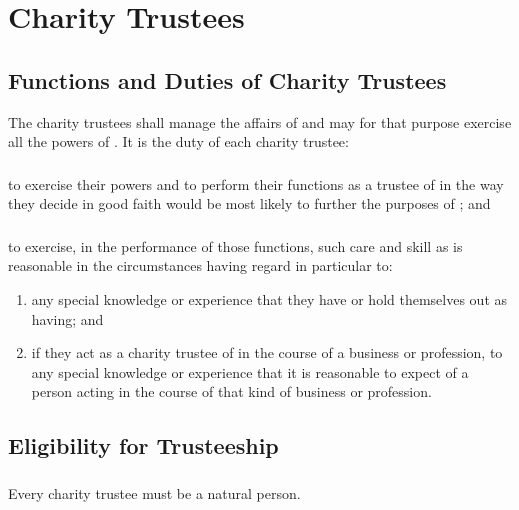 \section{Charity Trustees}
\label{sec:trustees}

    \subsection{Functions and Duties of Charity Trustees}\label{sec:trustee_duties}
    The charity trustees shall manage the affairs of \shortname{} and may for that purpose exercise all the powers of \shortname{}. It is the duty of each charity trustee:

        \subsubsection{}
        to exercise their powers and to perform their functions as a trustee of \shortname{} in the way they decide in good faith would be most likely to further the purposes of \shortname{}; and

        \subsubsection{}
        to exercise, in the performance of those functions, such care and skill as is reasonable in the circumstances having regard in particular to:
        \begin{enumerate}
            \item any special knowledge or experience that they have or hold themselves out as having; and
            \item if they act as a charity trustee of \shortname{} in the course of a business or profession, to any special knowledge or experience that it is reasonable to expect of a person acting in the course of that kind of business or profession.
        \end{enumerate}

    \subsection{Eligibility for Trusteeship}\label{sec:trustee_eligibility}

        \subsubsection{}
        Every charity trustee must be a natural person.

